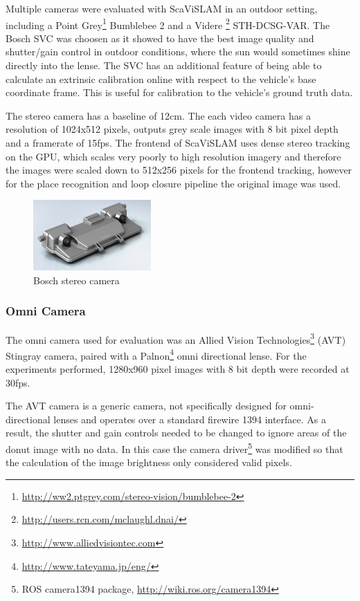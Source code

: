 Multiple cameras were evaluated with ScaViSLAM in an outdoor setting, including a Point Grey\footnote{\url{http://ww2.ptgrey.com/stereo-vision/bumblebee-2}} Bumblebee 2 and a Videre \footnote{\url{http://users.rcn.com/mclaughl.dnai/}} STH-DCSG-VAR.  The Bosch SVC was choosen as it showed to have the best image quality and shutter/gain control in outdoor conditions, where the sun would sometimes shine directly into the lense.  The SVC has an additional feature of being able to calculate an extrinsic calibration online with respect to the vehicle's base coordinate frame.  This is useful for calibration to the vehicle's ground truth data.

The stereo camera has a baseline of 12cm.  The each video camera has a resolution of 1024x512 pixels, outputs grey scale images with 8 bit pixel depth and a framerate of 15fps.  The frontend of ScaViSLAM uses dense stereo tracking on the GPU, which scales very poorly to high resolution imagery and therefore the images were scaled down to 512x256 pixels for the frontend tracking, however for the place recognition and loop closure pipeline the original image was used.

\begin{figure}[h]
  \centering
    \includegraphics[width=0.4\textwidth]{chapters/images/svc}
  \caption{Bosch stereo camera}
  \label{fig:bosch_svc}
\end{figure}

\subsubsection{Omni Camera}

The omni camera used for evaluation was an Allied Vision Technologies\footnote{\url{http://www.alliedvisiontec.com}} (AVT) Stingray camera, paired with a Palnon\footnote{\url{http://www.tateyama.jp/eng/}} omni directional lense.  For the experiments performed, 1280x960 pixel images with 8 bit depth were recorded at 30fps.  

The AVT camera is a generic camera, not specifically designed for omni-directional lenses and operates over a standard firewire 1394 interface.  As a result, the shutter and gain controls needed to be changed to ignore areas of the donut image with no data.  In this case the camera driver\footnote{ROS camera1394 package, \url{http://wiki.ros.org/camera1394}} was modified so that the calculation of the image brightness only considered valid pixels.

